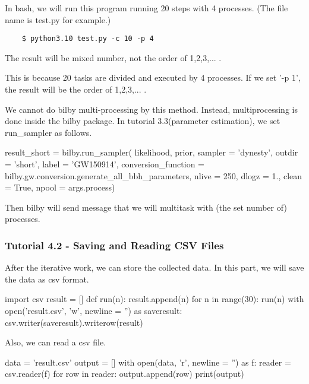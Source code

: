 In bash, we will run this program running 20 steps with 4 processes. (The file name is test.py for example.)

\begin{verbatim}
    $ python3.10 test.py -c 10 -p 4
\end{verbatim}

The result will be mixed number, not the order of 1,2,3,... .

This is because 20 tasks are divided and executed by 4 processes. If we set '-p 1', the result will be the order of 1,2,3,... .

We cannot do bilby multi-processing by this method. Instead, multiprocessing is done inside the bilby package. In tutorial 3.3(parameter estimation), we set run\_sampler as follows.

\begin{python}[python3]
    result_short = bilby.run_sampler(
            likelihood,
            prior,
            sampler = 'dynesty',
            outdir = 'short',
            label = 'GW150914',
            conversion_function = bilby.gw.conversion.generate_all_bbh_parameters,
            nlive = 250,
            dlogz = 1.,
            clean = True,
            npool = args.process)
\end{python}

Then bilby will send message that we will multitask with (the set number of) processes.

\subsubsection{Tutorial 4.2 - Saving and Reading CSV Files}

After the iterative work, we can store the collected data. In this part, we will save the data as csv format.

\begin{python}[python3]
    import csv
    result = []
    def run(n):
        result.append(n)
    for n in range(30):
        run(n)
    with open('result.csv',
          'w',
          newline = '') as saveresult:
    csv.writer(saveresult).writerow(result)
\end{python}

Also, we can read a csv file.

\begin{python}[python3]
    data = 'result.csv'
    output = []
    with open(data,
              'r',
              newline = '') as f:
        reader = csv.reader(f)
        for row in reader:
            output.append(row)
    print(output)
\end{python}

